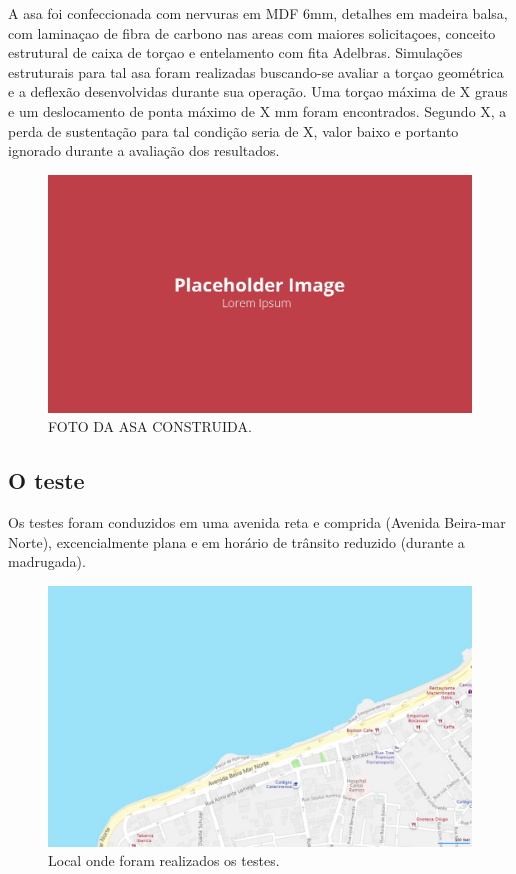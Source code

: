 A asa foi confeccionada com nervuras em MDF 6mm, detalhes em madeira balsa, com laminaçao de fibra de carbono nas areas com maiores solicitaçoes, conceito estrutural de caixa de torçao e entelamento com fita Adelbras. Simulações estruturais para tal asa foram realizadas buscando-se avaliar a torçao geométrica e a deflexão desenvolvidas durante sua operação. Uma torçao máxima de X graus e um deslocamento de ponta máximo de X mm foram encontrados. Segundo X, a perda de sustentação para tal condição seria de X, valor baixo e portanto ignorado durante a avaliação dos resultados.

\begin{figure}[!ht]
    \centering
    \includegraphics[width=.8\linewidth]{figuras/outras/placeholder.png}
    \caption{FOTO DA ASA CONSTRUIDA\cite{autor}.}
    \label{fig:placeholder}
\end{figure}

\subsection{O teste}

Os testes foram conduzidos em uma avenida reta e comprida (Avenida Beira-mar Norte), excencialmente plana e em horário de trânsito reduzido (durante a madrugada).

\begin{figure}[!ht]
    \centering
    \includegraphics[width=.8\linewidth]{figuras/internet/here_open_street_maps.png}
    \caption{Local onde foram realizados os testes\cite{autor}.}
    \label{fig:mapa_teste}
\end{figure}

